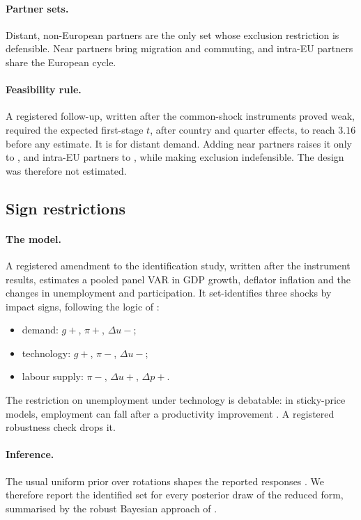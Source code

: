\paragraph{Partner sets.} Distant, non-European partners are the only set whose exclusion
restriction is defensible. Near partners bring migration and commuting, and intra-EU
partners share the European cycle.

\paragraph{Feasibility rule.} A registered follow-up, written after the common-shock
instruments proved weak, required the expected first-stage $t$,
after country and quarter effects, to reach $3.16$ before any estimate. It is
 for distant demand. Adding near partners raises it only to , and
intra-EU partners to , while making exclusion indefensible. The design was
therefore not estimated.

\subsection{Sign restrictions}

\paragraph{The model.} A registered amendment to the identification study, written after
the instrument results, estimates a pooled panel VAR in GDP growth, deflator inflation and
the changes in unemployment and participation. It set-identifies three shocks by impact
signs, following the logic of \citet{foroni2018laborsupply}:
\begin{itemize}
  \item demand: $g+$, $\pi+$, $\Delta u-$;
  \item technology: $g+$, $\pi-$, $\Delta u-$;
  \item labour supply: $\pi-$, $\Delta u+$, $\Delta p+$.
\end{itemize}
The restriction on unemployment under technology is debatable: in sticky-price models,
employment can fall after a productivity improvement \citep{gali1999technology}. A
registered robustness check drops it.

\paragraph{Inference.} The usual uniform prior over rotations shapes the reported responses
\citep{baumeister2015sign}. We therefore report the identified set for every posterior draw
of the reduced form, summarised by the robust Bayesian approach of
\citet{giacomini2021robust}.


